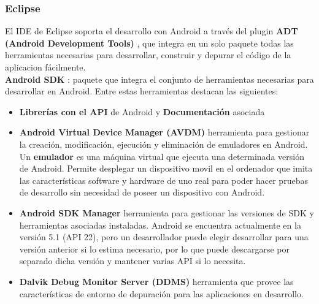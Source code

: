     		\subsubsection{Eclipse} \label{sssec:eclipse}
    
    El IDE de Eclipse \cite{ref:eclipse} soporta el desarrollo con Android a través del plugin \textbf{ADT (Android Development Tools)} \cite{ref:eclipse_adt}, que integra en un solo paquete todas las herramientas necesarias para desarrollar, construir y depurar el código de la aplicacion fácilmente. \\[.2cm]
    
    \textbf{Android SDK} \cite{ref:android_sdk}: paquete que integra el conjunto de herramientas necesarias para desarrollar en Android.  Entre estas herramientas destacan las siguientes:
    
    \begin{itemize}
    \item \textbf{Librerías con el API} de Android y \textbf{Documentación} asociada \cite{ref:android_api_reference}
    
    \item \textbf{Android Virtual Device Manager (AVDM)} \cite{ref:android_vdm} herramienta para gestionar la creación, modificación, ejecución y eliminación de emuladores en Android. Un \textbf{emulador} \cite{ref:android_emulator} es una máquina virtual que ejecuta una determinada versión de Android. Permite desplegar un dispositivo movil en el ordenador que imita las características software y hardware de uno real para poder hacer pruebas de desarrollo sin necesidad de poseer un dispositivo con Android. 
    
    \item \textbf{Android SDK Manager} \cite{ref:android_sdk_manager} herramienta para gestionar las versiones de SDK y herramientas asociadas instaladas. Android se encuentra actualmente en la versión 5.1 (API 22), pero un desarrollador puede elegir desarrollar para una versión anterior si lo estima necesario, por lo que puede descargarse por separado dicha versión y mantener varias API si lo necesita.
    
    \item \textbf{Dalvik Debug Monitor Server (DDMS)} \cite{ref:android_ddms} herramienta que provee las características de entorno de depuración para las aplicaciones en desarrollo.

    \end{itemize}
	
